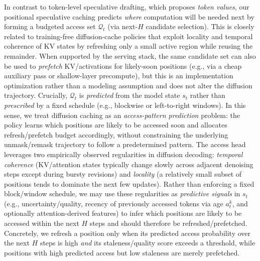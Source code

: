 \documentclass[11pt]{article}
\newcommand{\cQ}{\mathcal{Q}}
\begin{document}
In contrast to token-level speculative drafting, which proposes \emph{token values}, our positional
speculative caching predicts \emph{where} computation will be needed next by forming a budgeted access
set $\cQ_t$ (via next-$H$ candidate selection). This is closely related to training-free diffusion-cache
policies that exploit locality and temporal coherence of KV states by refreshing only a small active
region while reusing the remainder. When supported by the serving stack, the same candidate set
can also be used to \emph{prefetch} KV/activations for likely-soon positions (e.g., via a cheap auxiliary
pass or shallow-layer precompute), but this is an implementation optimization rather than a modeling
assumption and does not alter the diffusion trajectory.
Crucially, $\cQ_t$ is \emph{predicted} from the model state $s_t$ rather than
\emph{prescribed} by a fixed schedule (e.g., blockwise or left-to-right windows). In this sense, we treat
diffusion caching as an \emph{access-pattern prediction} problem: the policy learns which positions are
likely to be accessed soon and allocates refresh/prefetch budget accordingly, without constraining the
underlying unmask/remask trajectory to follow a predetermined pattern.
The access head leverages two empirically observed regularities in diffusion decoding: \emph{temporal coherence}
(KV/attention states typically change slowly across adjacent denoising steps except during bursty revisions)
and \emph{locality} (a relatively small subset of positions tends to dominate the next few updates).
Rather than enforcing a fixed block/window schedule, we may use these regularities as \emph{predictive signals} in $s_t$
(e.g., uncertainty/quality, recency of previously accessed tokens via age $a_t^k$, and optionally attention-derived features) to infer
which positions are likely to be accessed within the next $H$ steps and should therefore be refreshed/prefetched. Concretely, we refresh a position only when its predicted access probability over the next $H$ steps is high \emph{and} its staleness/quality score exceeds a threshold, while positions with high predicted access but low staleness are merely prefetched.
\end{document}
